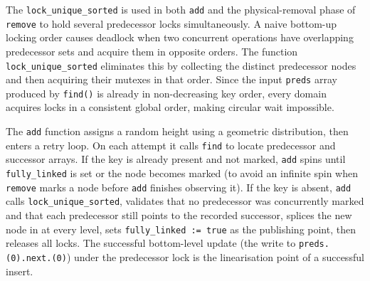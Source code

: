 \documentclass[11pt,a4paper]{article}
\begin{document}

The \texttt{lock\_unique\_sorted} is used in both \texttt{add} and the 
physical-removal phase of \texttt{remove} to hold
several predecessor locks simultaneously.  A naive bottom-up locking order
causes deadlock when two concurrent operations have overlapping predecessor
sets and acquire them in opposite orders.  The function \texttt{lock\_unique\_sorted} eliminates this by collecting the distinct predecessor nodes and then acquiring their mutexes in that order. Since the input \texttt{preds} array produced by \texttt{find()} is already in non-decreasing key order, every domain acquires locks in a consistent global order, making circular wait impossible.


\vspace{1em}
The \texttt{add} function assigns a random height using a geometric distribution, then
enters a retry loop.  On each attempt it calls \texttt{find} to locate
predecessor and successor arrays.  If the key is already present and not
marked, \texttt{add} spins until \texttt{fully\_linked} is set or the
node becomes marked (to avoid an infinite spin when \texttt{remove} marks a
node before \texttt{add} finishes observing it).  If the key is absent,
\texttt{add} calls \texttt{lock\_unique\_sorted}, validates that no predecessor
was concurrently marked and that each predecessor still points to the recorded
successor, splices the new node in at every level, sets
\texttt{fully\_linked~:=~true} as the publishing point, then releases all
locks.  The successful bottom-level update (the write to
\texttt{preds.(0).next.(0)}) under the predecessor lock is the linearisation
point of a successful insert.
\end{document}
